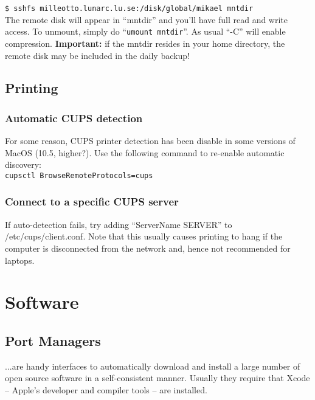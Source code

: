 \documentclass[a4paper,10pt]{article}
\begin{document}
\verb+$ sshfs milleotto.lunarc.lu.se:/disk/global/mikael mntdir+\\

\noindent The remote disk will appear in ``mntdir'' and you'll have full read and write access. To unmount, simply do ``\verb+umount mntdir+''. As usual ``-C'' will enable compression. \textbf{Important:} if the mntdir resides in your home directory, the remote disk may be included in the daily backup!

\subsection{Printing}
\subsubsection{Automatic CUPS detection}
For some reason, CUPS printer detection has been disable in some versions of MacOS (10.5, higher?). Use the following command to re-enable automatic discovery:\\

\verb+cupsctl BrowseRemoteProtocols=cups+

\subsubsection{Connect to a specific CUPS server}
If auto-detection fails, try adding ``ServerName SERVER'' to /etc/cups/client.conf. Note that this usually causes printing to hang if the computer is disconnected from the network and, hence not recommended for laptops.


\section{Software}
\subsection{Port Managers}
...are handy interfaces to automatically download and install a large number of open source software in a self-consistent manner. Usually they require that Xcode -- Apple's developer and compiler tools -- are installed.
\end{document}
